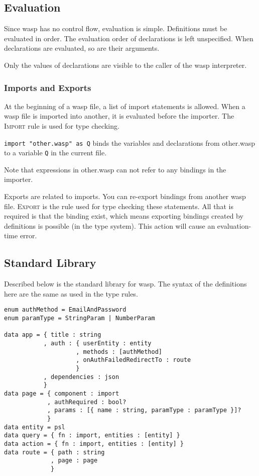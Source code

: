 \subsection{Evaluation}

Since wasp has no control flow, evaluation is simple. Definitions must be
evaluated in order. The evaluation order of declarations is left
unspecified. When declarations are evaluated, so are their arguments.

Only the values of declarations are visible to the caller of the wasp
interpreter.

\subsubsection{Imports and Exports}

At the beginning of a wasp file, a list of import statements is allowed. When
a wasp file is imported into another, it is evaluated before the importer. The
\textsc{Import} rule is used for type checking. 

\texttt{import "other.wasp" as Q} binds the variables and declarations from
other.wasp to a variable \texttt{Q} in the current file.

Note that expressions in other.wasp can not refer to any
bindings in the importer.

Exports are related to imports. You can re-export bindings from another wasp
file. \textsc{Export} is the rule used for type checking these statements. All
that is required is that the binding exist, which means exporting bindings
created by definitions is possible (in the type system). This action will cause
an evaluation-time error.

\subsection{Standard Library}

Described below is the standard library for wasp. The syntax of the definitions
here are the same as used in the type rules.

\begin{verbatim}
enum authMethod = EmailAndPassword
enum paramType = StringParam | NumberParam

data app = { title : string
           , auth : { userEntity : entity
                    , methods : [authMethod]
                    , onAuthFailedRedirectTo : route
                    }
           , dependencies : json
           }
data page = { component : import
            , authRequired : bool?
            , params : [{ name : string, paramType : paramType }]?
            }
data entity = psl
data query = { fn : import, entities : [entity] }
data action = { fn : import, entities : [entity] }
data route = { path : string
             , page : page
             }
\end{verbatim}

